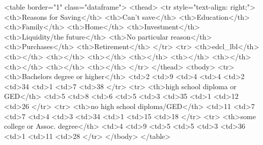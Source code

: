 <table border="1" class="dataframe">
  <thead>
    <tr style="text-align: right;">
      <th>Reasons for Saving</th>
      <th>Can't save</th>
      <th>Education</th>
      <th>Family</th>
      <th>Home</th>
      <th>Investment</th>
      <th>Liquidity/the future</th>
      <th>No particular reason</th>
      <th>Purchases</th>
      <th>Retirement</th>
    </tr>
    <tr>
      <th>edcl_lbl</th>
      <th></th>
      <th></th>
      <th></th>
      <th></th>
      <th></th>
      <th></th>
      <th></th>
      <th></th>
      <th></th>
    </tr>
  </thead>
  <tbody>
    <tr>
      <th>Bachelors degree or higher</th>
      <td>2%
      <td>9%
      <td>4%
      <td>4%
      <td>2%
      <td>34%
      <td>1%
      <td>7%
      <td>38%
    </tr>
    <tr>
      <th>high school diploma or GED</th>
      <td>5%
      <td>8%
      <td>6%
      <td>5%
      <td>3%
      <td>35%
      <td>1%
      <td>12%
      <td>26%
    </tr>
    <tr>
      <th>no high school diploma/GED</th>
      <td>11%
      <td>7%
      <td>7%
      <td>4%
      <td>3%
      <td>34%
      <td>1%
      <td>15%
      <td>18%
    </tr>
    <tr>
      <th>some college or Assoc. degree</th>
      <td>4%
      <td>9%
      <td>5%
      <td>5%
      <td>3%
      <td>36%
      <td>1%
      <td>11%
      <td>28%
    </tr>
  </tbody>
</table>

